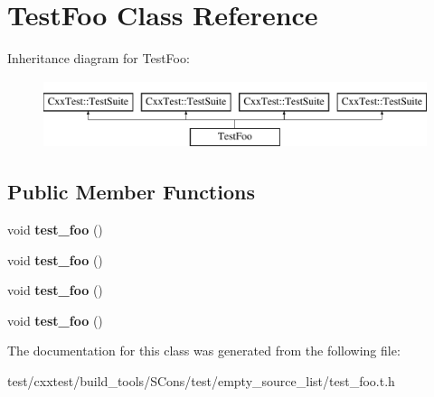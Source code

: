 \hypertarget{classTestFoo}{\section{Test\-Foo Class Reference}
\label{classTestFoo}
}
Inheritance diagram for Test\-Foo\-:\begin{figure}[H]
\begin{center}
\leavevmode
\includegraphics[height=2.000000cm]{classTestFoo}
\end{center}
\end{figure}
\subsection*{Public Member Functions}
\begin{DoxyCompactItemize}
\item 
\hypertarget{classTestFoo_a963fb1d7e10e3586f001fd3a68f509d7}{void {\bfseries test\-\_\-foo} ()}\label{classTestFoo_a963fb1d7e10e3586f001fd3a68f509d7}

\item 
\hypertarget{classTestFoo_a963fb1d7e10e3586f001fd3a68f509d7}{void {\bfseries test\-\_\-foo} ()}\label{classTestFoo_a963fb1d7e10e3586f001fd3a68f509d7}

\item 
\hypertarget{classTestFoo_a963fb1d7e10e3586f001fd3a68f509d7}{void {\bfseries test\-\_\-foo} ()}\label{classTestFoo_a963fb1d7e10e3586f001fd3a68f509d7}

\item 
\hypertarget{classTestFoo_a963fb1d7e10e3586f001fd3a68f509d7}{void {\bfseries test\-\_\-foo} ()}\label{classTestFoo_a963fb1d7e10e3586f001fd3a68f509d7}

\end{DoxyCompactItemize}


The documentation for this class was generated from the following file\-:\begin{DoxyCompactItemize}
\item 
test/cxxtest/build\-\_\-tools/\-S\-Cons/test/empty\-\_\-source\-\_\-list/test\-\_\-foo.\-t.\-h\end{DoxyCompactItemize}
